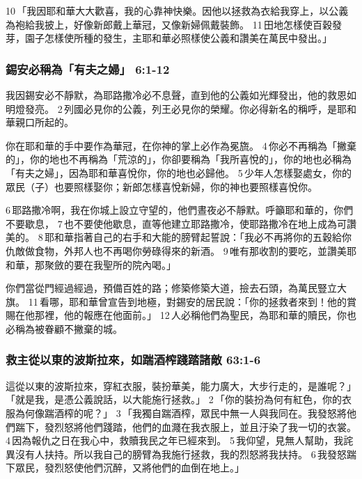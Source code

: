 10 「我因耶和華大大歡喜，我的心靠神快樂。因他以拯救為衣給我穿上，以公義為袍給我披上，好像新郎戴上華冠，又像新婦佩戴裝飾。 11 田地怎樣使百穀發芽，園子怎樣使所種的發生，主耶和華必照樣使公義和讚美在萬民中發出。」

\subsubsection{錫安必稱為「有夫之婦」 6:1-12}
我因錫安必不靜默，為耶路撒冷必不息聲，直到他的公義如光輝發出，他的救恩如明燈發亮。 2 列國必見你的公義，列王必見你的榮耀。你必得新名的稱呼，是耶和華親口所起的。

你在耶和華的手中要作為華冠，在你神的掌上必作為冕旒。 4 你必不再稱為「撇棄的」，你的地也不再稱為「荒涼的」，你卻要稱為「我所喜悅的」，你的地也必稱為「有夫之婦」，因為耶和華喜悅你，你的地也必歸他。 5 少年人怎樣娶處女，你的眾民（子）也要照樣娶你；新郎怎樣喜悅新婦，你的神也要照樣喜悅你。

6 耶路撒冷啊，我在你城上設立守望的，他們晝夜必不靜默。呼籲耶和華的，你們不要歇息， 7 也不要使他歇息，直等他建立耶路撒冷，使耶路撒冷在地上成為可讚美的。 8 耶和華指著自己的右手和大能的膀臂起誓說：「我必不再將你的五穀給你仇敵做食物，外邦人也不再喝你勞碌得來的新酒。 9 唯有那收割的要吃，並讚美耶和華，那聚斂的要在我聖所的院內喝。」

你們當從門經過經過，預備百姓的路；修築修築大道，撿去石頭，為萬民豎立大旗。 11 看哪，耶和華曾宣告到地極，對錫安的居民說：「你的拯救者來到！他的賞賜在他那裡，他的報應在他面前。」 12 人必稱他們為聖民，為耶和華的贖民，你也必稱為被眷顧不撇棄的城。

\subsubsection{救主從以東的波斯拉來，如踹酒榨踐踏諸敵 63:1-6}
這從以東的波斯拉來，穿紅衣服，裝扮華美，能力廣大，大步行走的，是誰呢？」「就是我，是憑公義說話，以大能施行拯救。」 2 「你的裝扮為何有紅色，你的衣服為何像踹酒榨的呢？」 3 「我獨自踹酒榨，眾民中無一人與我同在。我發怒將他們踹下，發烈怒將他們踐踏，他們的血濺在我衣服上，並且汙染了我一切的衣裳。 4 因為報仇之日在我心中，救贖我民之年已經來到。 5 我仰望，見無人幫助，我詫異沒有人扶持。所以我自己的膀臂為我施行拯救，我的烈怒將我扶持。 6 我發怒踹下眾民，發烈怒使他們沉醉，又將他們的血倒在地上。」

